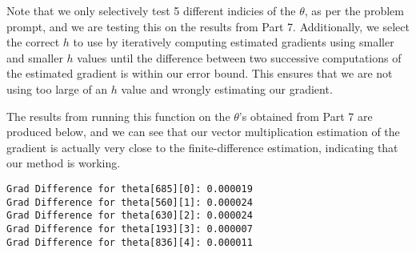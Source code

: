 \documentclass[11pt,a4paper]{report}
\begin{document}
Note that we only selectively test 5 different indicies of the $\theta$, as per the problem prompt, and we are testing this on the results from Part 7. Additionally, we select the correct $h$ to use by iteratively computing estimated gradients using smaller and smaller $h$ values until the difference between two successive computations of the estimated gradient is within our error bound. This ensures that we are not using too large of an $h$ value and wrongly estimating our gradient.

The results from running this function on the $\theta$'s obtained from Part 7 are produced below, and we can see that our vector multiplication estimation of the gradient is actually very close to the finite-difference estimation, indicating that our method is working.
\begin{lstlisting}
Grad Difference for theta[685][0]: 0.000019
Grad Difference for theta[560][1]: 0.000024
Grad Difference for theta[630][2]: 0.000024
Grad Difference for theta[193][3]: 0.000007
Grad Difference for theta[836][4]: 0.000011
\end{lstlisting}
\end{document}
